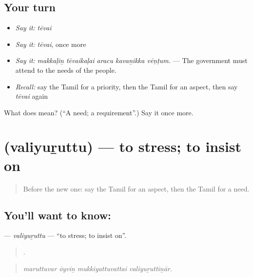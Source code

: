 \subsection*{Your turn}
\begin{itemize}
\raggedright
  \item \emph{Say it:} \emph{tēvai}
  \item \emph{Say it:} \emph{tēvai}, once more
  \item \emph{Say it:} \emph{makkaḷiṉ tēvaikaḷai aracu kavaṉikka vēṇṭum.} — The government must attend to the needs of the people.
  \item \emph{Recall:} say the Tamil for a priority, then the Tamil for an aspect, then say \emph{tēvai} again
\end{itemize}

\begin{tcolorbox}[breakable,colback=teal!4,colframe=teal!35!black,title={Before you move on}]
What does  mean? (\textquotedblleft{}A need; a requirement\textquotedblright{}.) Say it once more.
\end{tcolorbox}
\section[\texorpdfstring{\ta{வலியுறுத்து} (valiyuṟuttu)}{வலியுறுத்து (valiyuṟuttu)}]{ (valiyuṟuttu) — to stress; to insist on}

\label{lesson:TA-C354-valiyuruttu}



\begin{quote}
Before the new one: say the Tamil for an aspect, then the Tamil for a need.
\end{quote}

\subsection*{You'll want to know: }
\textbf{} — \emph{valiyuṟuttu} — \textquotedblleft{}to stress; to insist on\textquotedblright{}.

\begin{quote}
   .
\end{quote}

\begin{quote}
\emph{maruttuvar ōyviṉ mukkiyattuvattai valiyuṟuttiṉār.}
\end{quote}

